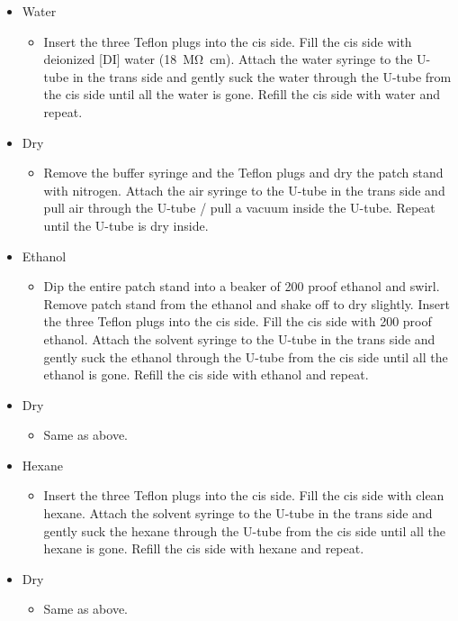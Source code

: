\begin{itemize}

\item Water

\begin{itemize}
\item Insert the three Teflon plugs into the cis side.  Fill the cis side with deionized [DI] water (\SI{18}{\mega\ohm\cm}).  Attach the water syringe to the U-tube in the trans side and gently suck the water through the U-tube from the cis side until all the water is gone.  Refill the cis side with water and repeat.
\end{itemize}

\item Dry

\begin{itemize}
\item Remove the buffer syringe and the Teflon plugs and dry the patch stand with nitrogen.  Attach the air syringe to the U-tube in the trans side and pull air through the U-tube / pull a vacuum inside the U-tube.  Repeat until the U-tube is dry inside.
\end{itemize}

\item Ethanol

\begin{itemize}
\item Dip the entire patch stand into a beaker of \num{200} proof ethanol and swirl.  Remove patch stand from the ethanol and shake off to dry slightly.  Insert the three Teflon plugs into the cis side.  Fill the cis side with \num{200} proof ethanol.  Attach the solvent syringe to the U-tube in the trans side and gently suck the ethanol through the U-tube from the cis side until all the ethanol is gone.  Refill the cis side with ethanol and repeat.
\end{itemize}

\item Dry

\begin{itemize}
\item Same as above.
\end{itemize}

\item Hexane

\begin{itemize}
\item Insert the three Teflon plugs into the cis side.  Fill the cis side with clean hexane.  Attach the solvent syringe to the U-tube in the trans side and gently suck the hexane through the U-tube from the cis side until all the hexane is gone.  Refill the cis side with hexane and repeat.
\end{itemize}

\item Dry

\begin{itemize}
\item Same as above.
\end{itemize}

\end{itemize}

